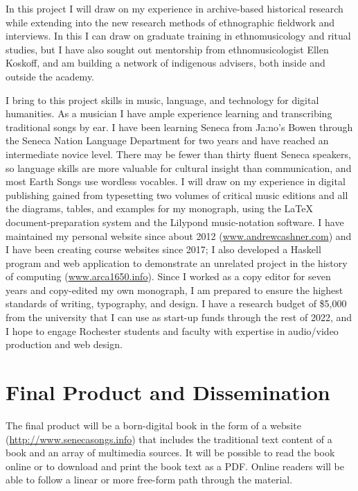 \documentclass{neh}
\begin{document}
In this project I will draw on my experience in archive-based historical
research while extending into the new research methods of ethnographic
fieldwork and interviews.
In this I can draw on graduate training in ethnomusicology and ritual studies,
but I have also sought out mentorship from ethnomusicologist Ellen Koskoff,
and am building a network of indigenous advisers, both inside and outside the
academy.

I bring to this project skills in music, language, and technology for
digital humanities.
As a musician I have ample experience learning and transcribing traditional
songs by ear.
I have been learning Seneca from Ja:no’s Bowen through the Seneca Nation
Language Department for two years and have reached an intermediate novice
level.
There may be fewer than thirty fluent Seneca speakers, so language skills are
more valuable for cultural insight than communication, and most Earth Songs
use wordless vocables.
I will draw on my experience in digital publishing gained from typesetting two
volumes of critical music editions and all the diagrams, tables, and examples
for my monograph, using the \LaTeX{} document-preparation system and the
Lilypond music-notation software.
I have maintained my personal website since about 2012
(\url{www.andrewcashner.com}) and I have been creating course websites 
since 2017; I also developed a Haskell program and web application to
demonstrate an unrelated project in the history of computing
(\url{www.arca1650.info}).
Since I worked as a copy editor for seven years and copy-edited my own
monograph, I am prepared to ensure the highest standards of writing,
typography, and design.
I have a research budget of \$5,000 from the university that I can use as
start-up funds through the rest of 2022, and I hope to engage Rochester
students and faculty with expertise in audio/video production and web design.
\section{Final Product and Dissemination}

The final product will be a born-digital book in the form of a website
(\url{http://www.senecasongs.info}) that includes the traditional text content
of a book and an array of multimedia sources.
It will be possible to read the book online or to download and print the book
text as a PDF.
Online readers will be able to follow a linear or more free-form path through
the material.
\end{document}
